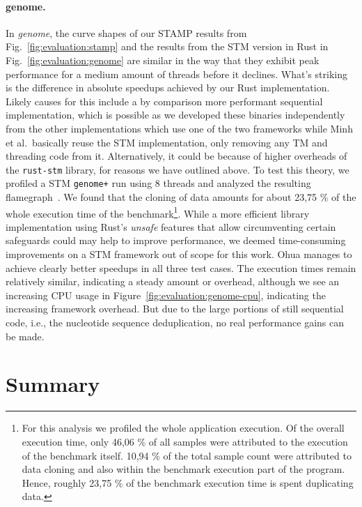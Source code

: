 \paragraph{genome.} In \emph{genome}, the curve shapes of our STAMP results from Fig.~\ref{fig:evaluation:stamp} and the results from the STM version in Rust in Fig.~\ref{fig:evaluation:genome} are similar in the way that they exhibit peak performance for a medium amount of threads before it declines.
What's striking is the difference in absolute speedups achieved by our Rust implementation.
Likely causes for this include a by comparison more performant sequential implementation, which is possible as we developed these binaries independently from the other implementations which use one of the two frameworks while Minh et al.\ basically reuse the STM implementation, only removing any TM and threading code from it.
Alternatively, it could be because of higher overheads of the \texttt{rust-stm} library, for reasons we have outlined above.
To test this theory, we profiled a STM \texttt{genome+} run using 8 threads and analyzed the resulting flamegraph~\cite{gregg2016flame}.
We found that the cloning of data amounts for about 23,75 \% of the whole execution time of the benchmark\footnote{For this analysis we profiled the whole application execution. Of the overall execution time, only 46,06 \% of all samples were attributed to the execution of the benchmark itself. 10,94 \% of the total sample count were attributed to data cloning and also within the benchmark execution part of the program. Hence, roughly 23,75 \% of the benchmark execution time is spent duplicating data.}.
While a more efficient library implementation using Rust's \emph{unsafe} features that allow circumventing certain safeguards could may help to improve performance, we deemed time-consuming improvements on a STM framework out of scope for this work.
Ohua manages to achieve clearly better speedups in all three test cases.
The execution times remain relatively similar, indicating a steady amount or overhead, although we see an increasing CPU usage in Figure~\ref{fig:evaluation:genome-cpu}, indicating the increasing framework overhead.
But due to the large portions of still sequential code, i.e., the nucleotide sequence deduplication, no real performance gains can be made.


\section{Summary}%
\label{sec:evaluation:summary}

